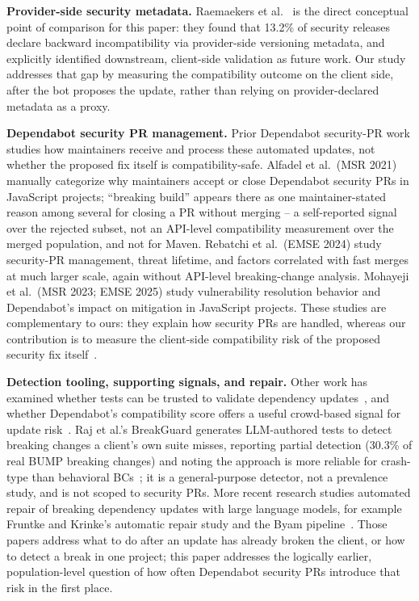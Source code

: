 \documentclass[10pt,journal]{IEEEtran}
\begin{document}
\textbf{Provider-side security metadata.} Raemaekers et al.~\cite{raemaekers2021}
is the direct conceptual point of comparison for this paper: they found that
13.2\% of security releases declare backward incompatibility via provider-side
versioning metadata, and explicitly identified downstream, client-side
validation as future work. Our study addresses that gap by measuring the
compatibility outcome on the client side, after the bot proposes the update,
rather than relying on provider-declared metadata as a proxy.

\textbf{Dependabot security PR management.} Prior Dependabot security-PR work
studies how maintainers receive and process these automated updates, not
whether the proposed fix itself is compatibility-safe. Alfadel et al.~(MSR
2021) manually categorize why maintainers accept or close Dependabot security
PRs in JavaScript projects; ``breaking build'' appears there as one
maintainer-stated reason among several for closing a PR without merging -- a
self-reported signal over the rejected subset, not an API-level compatibility
measurement over the merged population, and not for Maven. Rebatchi et al.~(EMSE
2024) study security-PR management, threat lifetime, and factors correlated with
fast merges at much larger scale, again without API-level breaking-change
analysis. Mohayeji et al.~(MSR 2023; EMSE 2025) study vulnerability resolution
behavior and Dependabot's impact on mitigation in JavaScript projects. These
studies are complementary to ours: they explain how security PRs are handled,
whereas our contribution is to measure the client-side compatibility risk of
the proposed security fix itself~\cite{alfadel2021,rebatchi2024,mohayeji2023,mohayeji2025}.

\textbf{Detection tooling, supporting signals, and repair.} Other work has
examined whether tests can be trusted to validate dependency
updates~\cite{hejderup2021}, and whether Dependabot's compatibility score
offers a useful crowd-based signal for update risk~\cite{rombaut2024}. Raj et
al.'s BreakGuard generates LLM-authored tests to detect breaking changes a
client's own suite misses, reporting partial detection (30.3\% of real BUMP
breaking changes) and noting the approach is more reliable for crash-type than
behavioral BCs~\cite{breakguard2026}; it is a general-purpose detector, not a
prevalence study, and is not scoped to security PRs. More recent research
studies automated repair of breaking dependency updates with large language
models, for example Fruntke and Krinke's automatic repair study and the Byam
pipeline~\cite{fruntke2025,byam2025}. Those papers address what to do after an
update has already broken the client, or how to detect a break in one project;
this paper addresses the logically earlier, population-level question of how
often Dependabot security PRs introduce that risk in the first place.
\end{document}
